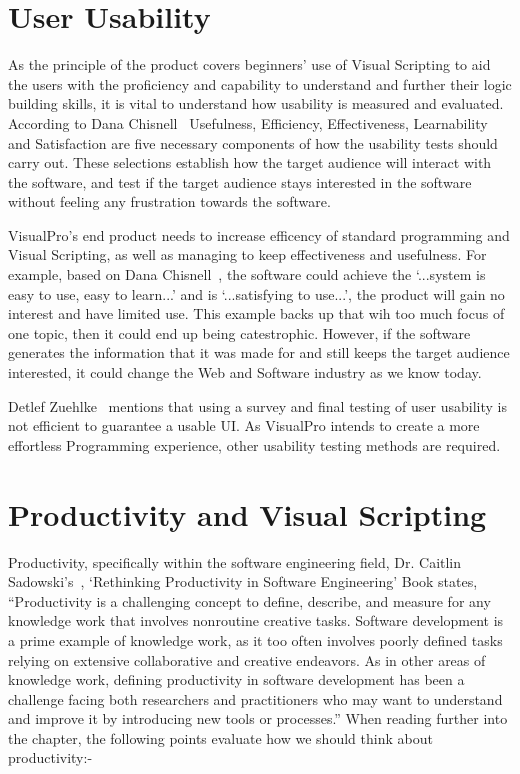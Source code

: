 \documentclass[12pt]{report} %
\begin{document}
	\section{User Usability}
		As the principle of the product covers beginners' use of Visual Scripting to aid the users with the proficiency and capability to understand and further their logic building skills, it is vital to understand how usability is measured and evaluated. According to Dana Chisnell~\cite{chisnell_dana_handbook_2008} Usefulness, Efficiency, Effectiveness, Learnability and Satisfaction are five necessary components of how the usability tests should carry out. These selections establish how the target audience will interact with the software, and test if the target audience stays interested in the software without feeling any frustration towards the software. 
		
		VisualPro's end product needs to increase efficency of standard programming and Visual Scripting, as well as managing to keep effectiveness and usefulness. For example, based on Dana Chisnell~\cite{chisnell_dana_handbook_2008}, the software could achieve the `...system is easy to use, easy to learn...' and is `...satisfying to use...', the product will gain no interest and have limited use. This example backs up that wih too much focus of one topic, then it could end up being catestrophic. However, if the software generates the information that it was made for and still keeps the target audience interested, it could change the Web and Software industry as we know today.

		Detlef Zuehlke~\cite{zuehlke_useware_2008} mentions that using a survey and final testing of user usability is not efficient to guarantee a usable UI. As VisualPro intends to create a more effortless Programming experience, other usability testing methods are required.
		
	\section{Productivity and Visual Scripting}
		Productivity, specifically within the software engineering field, Dr. Caitlin Sadowski's~\cite{dr_caitlin_sadowski_rethinking_2019}, `Rethinking Productivity in Software Engineering' Book states, ``Productivity is a challenging concept to define, describe, and measure for any knowledge work that involves nonroutine creative tasks. Software development is a prime example of knowledge work, as it too often involves poorly defined tasks relying on extensive collaborative and creative endeavors. As in other areas of knowledge work, defining productivity in software development has been a challenge facing both researchers and practitioners who may want to understand and improve it by introducing new tools or processes.'' When reading further into the chapter, the following points evaluate how we should think about productivity:-
\end{document}
